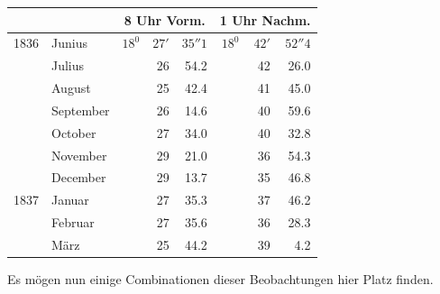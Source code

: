 \begin{center}\small
\begin{tabular}{rl|rrr|rrr}
&&\multicolumn{3}{c|}{8 Uhr Vorm.}&\multicolumn{3}{c}{1 Uhr Nachm.}\\\hline
1836&Junius&$18^0$&$27'$&$35''1$&$18^0$&$42'$&$52''4$\\
&Julius&&26&54.2&&42&26.0\\
&August&&25&42.4&&41&45.0\\
&September&&26&14.6&&40&59.6\\
&October&&27&34.0&&40&32.8\\
&November&&29&21.0&&36&54.3\\
&December&&29&13.7&&35&46.8\\[4pt]
1837&Januar&&27&35.3&&37&46.2\\
&Februar&&27&35.6&&36&28.3\\
&März&&25&44.2&&39&4.2
\end{tabular}
\end{center}

Es mögen nun einige Combinationen dieser Beobachtungen hier Platz finden.

